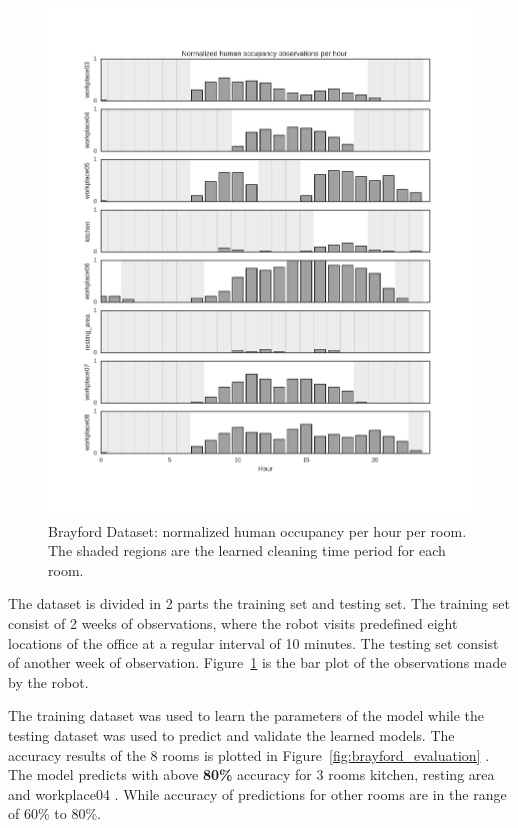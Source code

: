 \begin{figure}[htp]
\centering
\includegraphics[width=\textwidth]{images/occupancy_hist_withresults.png}
\caption[Brayford Dataset ]{Brayford Dataset: normalized human occupancy per hour per room. The shaded regions are the learned cleaning time period for each room.}
\label{fig:brayford_visualization}
\end{figure}

\FloatBarrier



The dataset is divided in 2 parts the training set and testing set. The training set consist of 2 weeks of observations, where the robot visits predefined eight locations of the office at a regular interval of 10 minutes. The testing set consist of another week of observation. Figure~\ref{fig:brayford_visualization} is the bar plot of the observations made by the robot. 



The training dataset was used to learn the parameters of the model while the testing dataset was used to predict and validate the learned models. 
The accuracy results of the 8 rooms is plotted in Figure~\ref{fig:brayford_evaluation} . The model predicts with above \textbf{80\%} accuracy for 3 rooms kitchen, resting area and workplace04 . While accuracy of predictions for other rooms are in the range of 60\% to 80\%.

